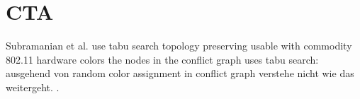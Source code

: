   \section{\ac{CTA}}
    Subramanian et al. use tabu search 
    topology preserving
    usable with commodity 802.11 hardware
    colors the nodes in the conflict graph
      uses tabu search:
	ausgehend von random color assignment in conflict graph
	verstehe nicht wie das weitergeht.
    \cite{CTA}.
  
